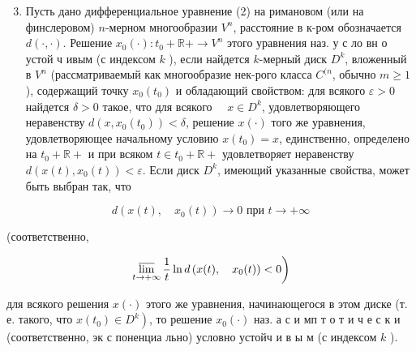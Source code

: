 \documentclass[10pt]{article}
\begin{document}
\begin{enumerate}

  \setcounter{enumi}{2}

  \item Пусть дано дифференциальное уравнение (2) на римановом (или на финслеровом) $n$-мерном многообразии $V^{n}$, расстояние в к-ром обозначается $d(\cdot, \cdot)$. Решение $x_{0}(\cdot): t_{0}+\mathbb{R}+\longrightarrow V^{n}$ этого уравнения наз. у с ло вн о устой ч ивым (с индексом $k$ ), если найдется $k$-мерный диск $D^{k}$, вложенный в $V^{n}$ (рассматриваемый как многообразие нек-рого класса $C^{(n}$, обычно $m \geqslant 1$ ), содержащий точку $x_{0}\left(t_{0}\right)$ и обладающий свойством: для всякого $\varepsilon>0$ найдется $\delta>0$ такое, что для всякого $\quad x \in D^{k}$, удовлетворяющего неравенству $d\left(x, x_{0}\left(t_{0}\right)\right)<\delta$, решение $x(\cdot)$ того же уравнения, удовлетворяющее начальному условию $x\left(t_{0}\right)=x$, единственно, определено на $t_{0}+\mathbb{R}+$ и при всяком $t \in t_{0}+\mathbb{R}+$ удовлетворяет неравенству $d\left(x(t), x_{0}(t)\right)<\varepsilon$. Если диск $D^{k}$, имеющий указанные свойства, может быть выбран так, что

\end{enumerate}



\[

d\left(x(t), \quad x_{0}(t)\right) \longrightarrow 0 \text { при } t \longrightarrow+\infty

\]



(соответственно,



\[

\left.\varlimsup_{t \rightarrow+\infty} \frac{1}{t} \ln d\left(x(t), \quad x_{0}(t)\right)<0\right)

\]



для всякого решения $x(\cdot)$ этого же уравнения, начинающегося в этом диске (т. е. такого, что $\left.x\left(t_{0}\right) \in D^{k}\right)$, то решение $x_{0}(\cdot)$ наз. а с и мп т о т и ч е с к и (соответственно, эк с поненциа льно) условно устойч и в ы м (с индексом $k$ ).
\end{document}

